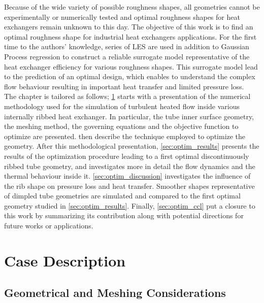 Because of the wide variety of possible roughness shapes, all geometries cannot be experimentally or numerically tested and optimal roughness shapes for heat exchangers remain unknown to this day. The objective of this work is to find an optimal roughness shape for industrial heat exchangers applications. For the first time to the authors’ knowledge, series of LES are used in addition to Gaussian Process regression \cite{rasmussen2006} to construct a reliable surrogate model representative of the heat exchanger efficiency for various roughness shapes. This surrogate model lead to the prediction of an optimal design, which enables to understand the complex flow behaviour resulting in important heat transfer and limited pressure loss.\\

The chapter is tailored as follows; \cref{sec:optim_case} starts with a presentation of the numerical methodology used for the simulation of turbulent heated flow inside various internally ribbed heat exchanger. In particular, the tube inner surface geometry, the meshing method, the governing equations and the objective function to optimize are presented.  then describe the technique employed to optimize the geometry. After this methodological presentation, \cref{sec:optim_results} presents the results of the optimization procedure leading to a first optimal discontinuously ribbed tube geometry, and investigates more in detail the flow dynamics and the thermal behaviour inside it. \cref{sec:optim_discussion} investigates the influence of the rib shape on pressure loss and heat transfer. Smoother shapes representative of dimpled tube geometries are simulated and compared to the first optimal geometry studied in \cref{sec:optim_results}. Finally, \cref{sec:optim_ccl} put a closure to this work by summarizing its contribution along with potential directions for future works or applications.

\section{Case Description}
\label{sec:optim_case}

\subsection{Geometrical and Meshing Considerations}

